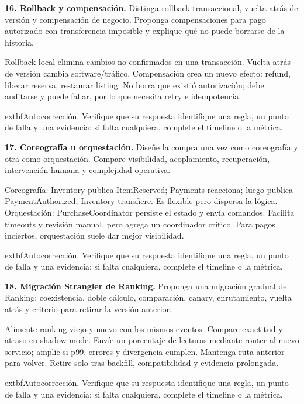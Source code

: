 \documentclass[variant=guiaresuelta,cover=institutional,mode=screen]{ua-engineering-v6-article}
\begin{document}
\begin{uaexercise}
\textbf{16. Rollback y compensación.} Distinga rollback transaccional, vuelta atrás de versión y compensación de negocio. Proponga compensaciones para pago autorizado con transferencia imposible y explique qué no puede borrarse de la historia.
\end{uaexercise}
\begin{uaanswer}
Rollback local elimina cambios no confirmados en una transacción. Vuelta atrás de versión cambia software/tráfico. Compensación crea un nuevo efecto: refund, liberar reserva, restaurar listing. No borra que existió autorización; debe auditarse y puede fallar, por lo que necesita retry e idempotencia.
\par\smallskip	extbf{Autocorrección.} Verifique que su respuesta identifique una regla, un punto de falla y una evidencia; si falta cualquiera, complete el timeline o la métrica.
\end{uaanswer}
\begin{uaexercise}
\textbf{17. Coreografía u orquestación.} Diseñe la compra una vez como coreografía y otra como orquestación. Compare visibilidad, acoplamiento, recuperación, intervención humana y complejidad operativa.
\end{uaexercise}
\begin{uaanswer}
Coreografía: Inventory publica ItemReserved; Payments reacciona; luego publica PaymentAuthorized; Inventory transfiere. Es flexible pero dispersa la lógica. Orquestación: PurchaseCoordinator persiste el estado y envía comandos. Facilita timeouts y revisión manual, pero agrega un coordinador crítico. Para pagos inciertos, orquestación suele dar mejor visibilidad.
\par\smallskip	extbf{Autocorrección.} Verifique que su respuesta identifique una regla, un punto de falla y una evidencia; si falta cualquiera, complete el timeline o la métrica.
\end{uaanswer}
\begin{uaexercise}
\textbf{18. Migración Strangler de Ranking.} Proponga una migración gradual de Ranking: coexistencia, doble cálculo, comparación, canary, enrutamiento, vuelta atrás y criterio para retirar la versión anterior.
\end{uaexercise}
\begin{uaanswer}
Alimente ranking viejo y nuevo con los mismos eventos. Compare exactitud y atraso en shadow mode. Envíe un porcentaje de lecturas mediante router al nuevo servicio; amplíe si p99, errores y divergencia cumplen. Mantenga ruta anterior para volver. Retire solo tras backfill, compatibilidad y evidencia prolongada.
\par\smallskip	extbf{Autocorrección.} Verifique que su respuesta identifique una regla, un punto de falla y una evidencia; si falta cualquiera, complete el timeline o la métrica.
\end{uaanswer}
\end{document}
